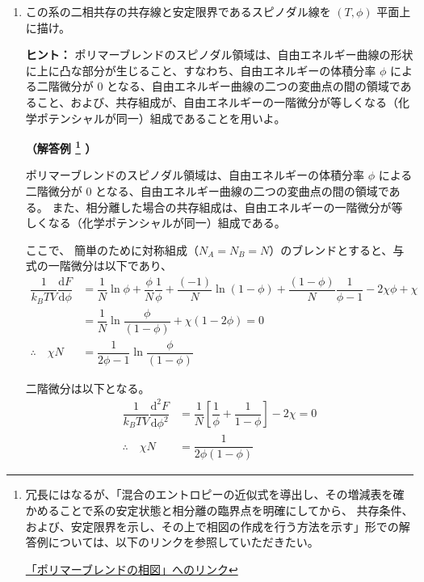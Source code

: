 \documentclass[uplatex,dvipdfmx,a4paper,11pt]{jsarticle}
\newcommand{\diff}{\mathrm d}
\newcommand{\difd}[2]{\dfrac{\diff #1}{\diff #2}}
\newcommand{\difdd}[2]{\dfrac{\diff^2 #1}{\diff #2^2}}
\begin{document}
\newpage


\begin{enumerate}
\setlength{\parskip}{0cm} %
\setlength{\itemsep}{0.5cm} %

\item
この系の二相共存の共存線と安定限界であるスピノダル線を $(T, \phi)$ 平面上に描け。

\begin{itembox}[l]{{\bf ヒント：}}
ポリマーブレンドのスピノダル領域は、自由エネルギー曲線の形状に上に凸な部分が生じること、すなわち、自由エネルギーの体積分率 $\phi$ による二階微分が 0 となる、自由エネルギー曲線の二つの変曲点の間の領域であること、および、共存組成が、自由エネルギーの一階微分が等しくなる（化学ポテンシャルが同一）組成であることを用いよ。
\end{itembox}



{\bf （解答例
\footnote
{
冗長にはなるが、「混合のエントロピーの近似式を導出し、その増減表を確かめることで系の安定状態と相分離の臨界点を明確にしてから、
共存条件、および、安定限界を示し、その上で相図の作成を行う方法を示す」形での解答例については、以下のリンクを参照していただきたい。

\href{https://dl.dropboxusercontent.com/u/18899343/physics/Phase_Separation/Phase_Separation.pdf}{「ポリマーブレンドの相図」へのリンク}
}
）}

ポリマーブレンドのスピノダル領域は、自由エネルギーの体積分率 $\phi$ による二階微分が 0 となる、自由エネルギー曲線の二つの変曲点の間の領域である。
また、相分離した場合の共存組成は、自由エネルギーの一階微分が等しくなる（化学ポテンシャルが同一）組成である。

ここで、 簡単のために対称組成（$N_A = N_B = N$）のブレンドとすると、与式の一階微分は以下であり、
\begin{align*}
\dfrac{1}{k_B T V} \difd{F}{\phi} 
	&= \dfrac{1}{N} \ln \phi + \dfrac{\phi}{N} \dfrac{1}{\phi} + \dfrac{(-1)}{N} \ln (1-\phi)  + \dfrac{(1-\phi)}{N} \dfrac{1}{\phi-1} -2 \chi \phi  + \chi \\
	&= \dfrac{1}{N} \ln \dfrac{\phi}{(1-\phi)} + \chi (1-2\phi) = 0 \\
\therefore \quad \chi N &= \dfrac{1}{2\phi -1} \ln \dfrac{\phi}{(1-\phi)}
\end{align*}

二階微分は以下となる。
\begin{align*}
\dfrac{1}{k_B T V} \difdd{F}{\phi} 
	&= \dfrac{1}{N} \left[\dfrac{1}{\phi} + \dfrac{1}{1-\phi} \right] -2 \chi = 0 \\
\therefore \quad \chi N &= \dfrac{1}{2\phi(1-\phi)}
\end{align*}


\end{enumerate}
\end{document}
